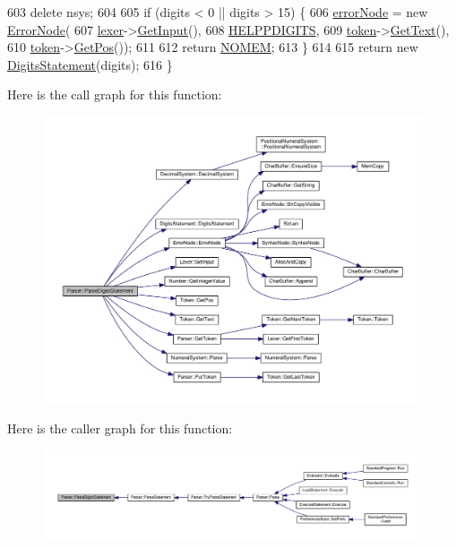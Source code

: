 \begin{DoxyCode}
603     \textcolor{keyword}{delete} nsys;
604 
605     \textcolor{keywordflow}{if} (digits < 0 || digits > 15) \{
606         \hyperlink{classParser_ab482ff79113ad2f1ef60bc6dd18528d1}{errorNode} = \textcolor{keyword}{new} \hyperlink{classErrorNode}{ErrorNode}(
607             \hyperlink{classParser_a8a8214126b0b0455e3ce375f3e9b20bf}{lexer}->\hyperlink{classLexer_a3032cbeb851294bccd61b722d9a86265}{GetInput}(),
608             \hyperlink{text_8h_a06483f1d13dc5bbd6a855b5c716248a9}{HELPPDIGITS},
609             \hyperlink{classParser_a467028559d31c5b33f16ca8be56715cc}{token}->\hyperlink{structToken_a15f1043de07ce8e452fbf115b85def71}{GetText}(),
610             \hyperlink{classParser_a467028559d31c5b33f16ca8be56715cc}{token}->\hyperlink{structToken_a5f93ea94940a6eeb060507e1da594599}{GetPos}());
611 
612         \textcolor{keywordflow}{return} \hyperlink{platform_8h_a46ff2bfbf0d44b8466a2251d5bd5e6f8}{NOMEM};
613     \}
614 
615     \textcolor{keywordflow}{return} \textcolor{keyword}{new} \hyperlink{classDigitsStatement}{DigitsStatement}(digits);
616 \}
\end{DoxyCode}


Here is the call graph for this function\+:\nopagebreak
\begin{figure}[H]
\begin{center}
\leavevmode
\includegraphics[width=350pt]{classParser_a14aa2850063f998f76530e027c3ef399_cgraph}
\end{center}
\end{figure}




Here is the caller graph for this function\+:\nopagebreak
\begin{figure}[H]
\begin{center}
\leavevmode
\includegraphics[width=350pt]{classParser_a14aa2850063f998f76530e027c3ef399_icgraph}
\end{center}
\end{figure}


